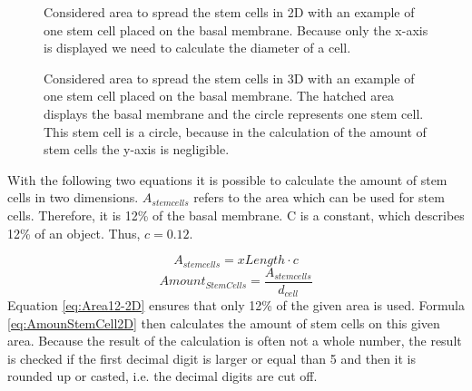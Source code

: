 \begin{figure}[h]
\begin{center}
\caption{Considered area to spread the stem cells in 2D with an example of one stem cell placed on the basal membrane. Because only the x-axis is displayed we need to calculate the diameter of a cell.}
\label{tikz:AreaIn2D}
\end{center}
\end{figure}


\begin{figure}[h]
\begin{center}
\caption{Considered area to spread the stem cells in 3D with an example of one stem cell placed on the basal membrane. The hatched area displays the basal membrane and the circle represents one stem cell. This stem cell is a circle, because in the calculation of the amount of stem cells the y-axis is negligible.}
\label{tikz:AreaIn3D}
\end{center}
\end{figure}


With the following two equations it is possible to calculate the amount of stem cells in two dimensions. $A_{stem cells}$ refers to the area which can be used for stem cells. Therefore, it is 12\% of the basal membrane. C is a constant, which describes 12\% of an object. Thus, $c=0.12$.

\begin{equation}\label{eq:Area12-2D}
A_{stem cells} = xLength \cdot c
\end{equation}
\begin{equation}\label{eq:AmounStemCell2D}
Amount_{StemCells} = \dfrac{A_{stem cells}}{d_{cell}} 
\end{equation}
Equation \ref{eq:Area12-2D} ensures that only 12\% of the given area is used. Formula \ref{eq:AmounStemCell2D} then calculates the amount of stem cells on this given area. Because the result of the calculation is often not a whole number, the result is checked if the first decimal digit is larger or equal than 5 and then it is rounded up or casted, i.e. the decimal digits are cut off.

